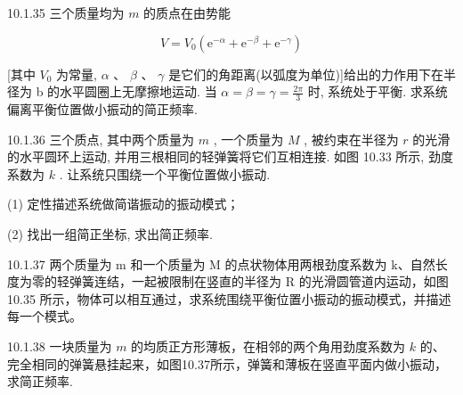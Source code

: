 \begin{problem}{10.1.35}
三个质量均为 $m$ 的质点在由势能

\[
V = V _ {0} \left(\mathrm{e} ^ {- \alpha} + \mathrm{e} ^ {- \beta} + \mathrm{e} ^ {- \gamma}\right)
\]

[其中 $V_{0}$ 为常量, $\alpha$ 、 $\beta$ 、 $\gamma$ 是它们的角距离(以弧度为单位)]给出的力作用下在半径为 b 的水平圆圈上无摩擦地运动. 当 $\alpha = \beta = \gamma = \frac{2\pi}{3}$ 时, 系统处于平衡. 求系统偏离平衡位置做小振动的简正频率.
\begin{center}

\end{center}
\end{problem}
\clearpage


\begin{problem}{10.1.36}
三个质点, 其中两个质量为 $m$ , 一个质量为 $M$ , 被约束在半径为 $r$ 的光滑的水平圆环上运动, 并用三根相同的轻弹簧将它们互相连接. 如图 10.33 所示, 劲度系数为 $k$ . 让系统只围绕一个平衡位置做小振动.

(1) 定性描述系统做简谐振动的振动模式；

(2) 找出一组简正坐标, 求出简正频率.
\begin{center}

\end{center}
\begin{center}

\end{center}
\end{problem}
\clearpage


\begin{problem}{10.1.37}
两个质量为 m 和一个质量为 M 的点状物体用两根劲度系数为 k、自然长度为零的轻弹簧连结，一起被限制在竖直的半径为 R 的光滑圆管道内运动，如图 10.35 所示，物体可以相互通过，求系统围绕平衡位置小振动的振动模式，并描述每一个模式。
\begin{center}

\end{center}
\end{problem}
\clearpage


\begin{problem}{10.1.38}
一块质量为 $m$ 的均质正方形薄板，在相邻的两个角用劲度系数为 $k$ 的、完全相同的弹簧悬挂起来，如图10.37所示，弹簧和薄板在竖直平面内做小振动，求简正频率.
\begin{center}

\end{center}
\end{problem}
\clearpage



